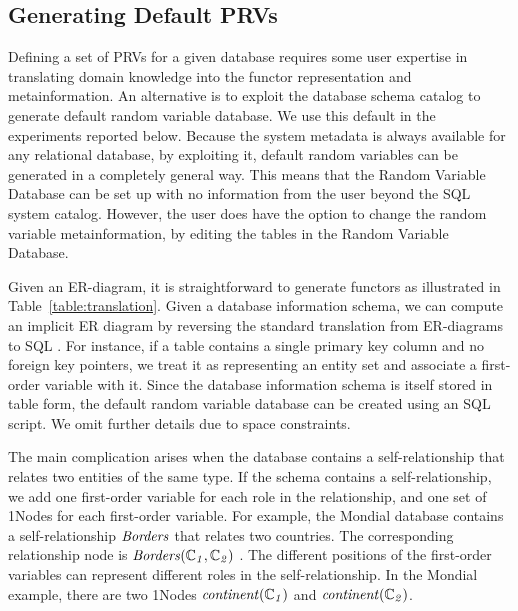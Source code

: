 \documentclass{vldb}
\begin{document}
\subsection{Generating Default PRVs} Defining a set of PRVs for a given database requires some user expertise in translating domain knowledge into the functor representation and metainformation.
An alternative is to exploit the database schema catalog to generate default random variable database.
We use this default in the experiments reported below.  Because the system metadata is always available for any relational database,  by exploiting it, default random variables can be generated in a completely general way. This means that the Random Variable Database can be set up with no information from the user beyond  the SQL system catalog. However, the user does have the option to change the random variable metainformation, by editing the tables in the Random Variable Database.


Given an ER-diagram, it is straightforward to generate functors as illustrated in Table~\ref{table:translation}.
 Given a database information schema, we can compute an implicit ER diagram by reversing the standard translation from ER-diagrams to SQL \cite{Ullman1982}.
For instance, if a table contains a single primary key column and no foreign key pointers, we treat it as representing an entity set and associate a first-order variable with it. 
Since the database information schema is itself stored in table form, the default random variable database can be created using an SQL script. 
We omit further details due to space constraints.

The main complication arises when the database contains a self-relationship \cite{Heckermann} that relates two entities of the same type. If the schema contains a self-relationship, we add one first-order variable for each role in the relationship, and one set of 1Nodes for each first-order variable. 
For example, the Mondial database contains a self-relationship $\it{Borders}$ that relates two countries. 
The corresponding relationship node is $\it{Borders}(\mathbb{C}_{1},\mathbb{C}_{2})$ . The different positions of the first-order variables can represent different roles in the self-relationship.
 In the Mondial example, there are two 1Nodes $\it{continent}(\mathbb{C}_{1})$ and $\it{continent}(\mathbb{C}_{2})$.
\end{document}
